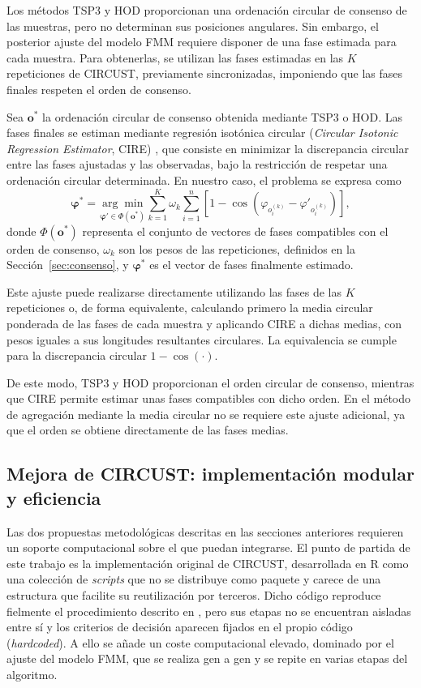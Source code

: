 \documentclass[12pt, a4paper]{report}
\begin{document}
Los métodos TSP3 y HOD proporcionan una ordenación circular de consenso de las muestras, pero no determinan sus posiciones angulares. Sin embargo, el posterior ajuste del modelo FMM requiere disponer de una fase estimada para cada muestra. Para obtenerlas, se utilizan las fases estimadas en las \(K\) repeticiones de CIRCUST, previamente sincronizadas, imponiendo que las fases finales respeten el orden de consenso.

Sea \(\mathbf{o}^{*}\) la ordenación circular de consenso obtenida mediante TSP3 o HOD. Las fases finales se estiman mediante regresión isotónica circular (\textit{Circular Isotonic Regression Estimator}, CIRE) \citep{rueda2009cire}, que consiste en minimizar la discrepancia circular entre las fases ajustadas y las observadas, bajo la restricción de respetar una ordenación circular determinada. En nuestro caso, el problema se expresa como
\[
\boldsymbol{\varphi}^{*}
=\underset{\boldsymbol{\varphi}'\in\Phi(\mathbf{o}^{*})}{\arg\min}
\sum_{k=1}^{K}\omega_k\sum_{i=1}^{n}\left[1-\cos\left(\varphi_{o_i^{(k)}}-\varphi'_{o_i^{(k)}}\right)\right],
\]
donde \(\Phi(\mathbf{o}^{*})\) representa el conjunto de vectores de fases compatibles con el orden de consenso, \(\omega_k\) son los pesos de las repeticiones, definidos en la Sección~\ref{sec:consenso}, y \(\boldsymbol{\varphi}^{*}\) es el vector de fases finalmente estimado.

Este ajuste puede realizarse directamente utilizando las fases de las \(K\) repeticiones o, de forma equivalente, calculando primero la media circular ponderada de las fases de cada muestra y aplicando CIRE a dichas medias, con pesos iguales a sus longitudes resultantes circulares. La equivalencia se cumple para la discrepancia circular \(1-\cos(\cdot)\).

De este modo, TSP3 y HOD proporcionan el orden circular de consenso, mientras que CIRE permite estimar unas fases compatibles con dicho orden. En el método de agregación mediante la media circular no se requiere este ajuste adicional, ya que el orden se obtiene directamente de las fases medias.

\subsection{Mejora de CIRCUST: implementación modular y eficiencia}
\label{sec:implementacion}
Las dos propuestas metodológicas descritas en las secciones anteriores requieren un soporte computacional sobre el que puedan integrarse. El punto de partida de este trabajo es la implementación original de CIRCUST, desarrollada en R como una colección de \textit{scripts} que no se distribuye como paquete y carece de una estructura que facilite su reutilización por terceros. Dicho código reproduce fielmente el procedimiento descrito en \citet{larriba2023}, pero sus etapas no se encuentran aisladas entre sí y los criterios de decisión aparecen fijados en el propio código (\textit{hardcoded}). A ello se añade un coste computacional elevado, dominado por el ajuste del modelo FMM, que se realiza gen a gen y se repite en varias etapas del algoritmo.
\end{document}
